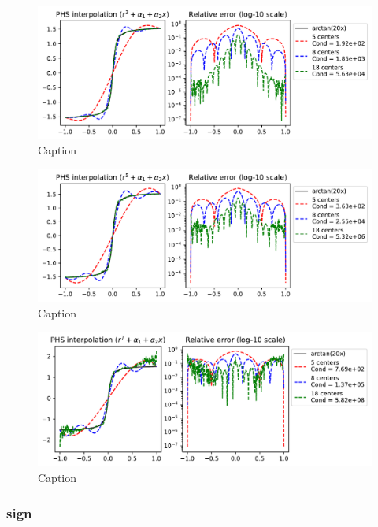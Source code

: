 \documentclass[12pt]{report} %
\begin{document}
\begin{figure}[ht]
  \centering
  \includegraphics[width=\textwidth]{imagenes/phs_interpolation/arctan20x_r3_deg1.pdf}
  \caption{Caption}
  \label{fig:arctan20x-r3-deg1}
\end{figure}

\begin{figure}[ht]
  \centering
  \includegraphics[width=\textwidth]{imagenes/phs_interpolation/arctan20x_r5_deg1.pdf}
  \caption{Caption}
  \label{fig:arctan20x-r5-deg1}
\end{figure}

\begin{figure}[ht]
  \centering
  \includegraphics[width=\textwidth]{imagenes/phs_interpolation/arctan20x_r7_deg1.pdf}
  \caption{Caption}
  \label{fig:arctan20x-r7-deg1}
\end{figure}

\subsubsection{sign}
\end{document}
